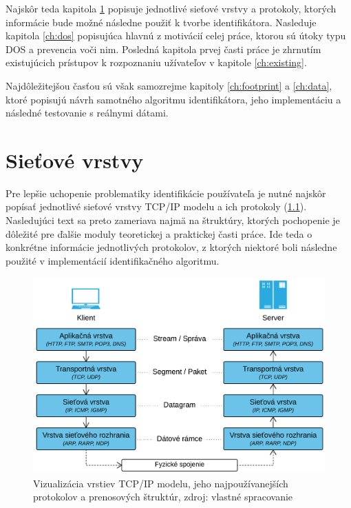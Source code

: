 \documentclass[
  printed, %
  table,   %
  lof,     %
  nolot,   %
  nocover
]{fithesis3}
\begin{document}
Najskôr teda kapitola
\ref{ch:net-layers} popisuje jednotlivé sieťové vrstvy a protokoly, ktorých
informácie bude možné následne použiť k tvorbe identifikátora. 
Nasleduje kapitola \ref{ch:dos} popisujúca hlavnú z motivácií 
celej práce, ktorou sú útoky typu DOS a prevencia voči nim.
Posledná kapitola prvej časti práce je zhrnutím
existujúcich prístupov k rozpoznaniu užívateľov v kapitole \ref{ch:existing}.

Najdôležitejšou časťou sú však
samozrejme kapitoly \ref{ch:footprint} a \ref{ch:data}, ktoré popisujú návrh samotného 
algoritmu identifikátora, jeho implementáciu a následné testovanie s reálnymi dátami.

\chapter{Sieťové vrstvy}
\label{ch:net-layers}
Pre lepšie uchopenie problematiky identifikácie používateľa je nutné najskôr
popísať jednotlivé sieťové vrstvy TCP/IP modelu a
ich protokoly (\ref{fig:net-layers}). Nasledujúci text sa preto zameriava najmä na štruktúry, ktorých pochopenie je
dôležité pre ďalšie moduly teoretickej a praktickej časti práce. Ide teda o
konkrétne informácie jednotlivých protokolov, z ktorých niektoré boli následne použité v implementácií
identifikačného algoritmu.

\begin{figure}[h]
  \centering
    \includegraphics[width=\textwidth]{images/net-layers.png}
  \caption{Vizualizácia vrstiev TCP/IP modelu, jeho najpoužívanejších protokolov
  a prenosových štruktúr, zdroj: vlastné spracovanie}
  \label{fig:net-layers}
\end{figure}
\end{document}
